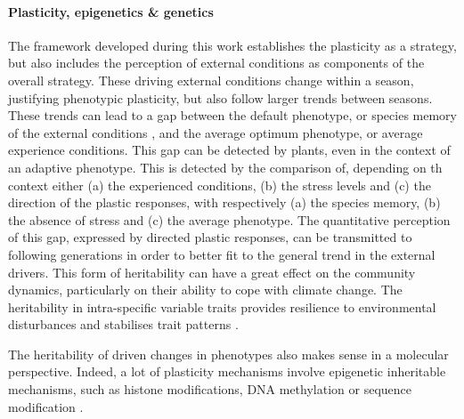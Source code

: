 

\paragraph{Plasticity, epigenetics \& genetics}

The framework developed during this work establishes the plasticity as a strategy, but also includes the perception of external conditions as components of the overall strategy. These driving external conditions change within a season, justifying phenotypic plasticity, but also follow larger trends between seasons. These trends can lead to a gap between the default phenotype, or species memory of the external conditions , and the average optimum phenotype, or average experience conditions. This gap can be detected by plants, even in the context of an adaptive phenotype. This is detected by the comparison of, depending on th context either (a) the experienced conditions, (b) the stress levels and (c) the direction of the plastic responses, with respectively (a) the species memory, (b) the absence of stress and (c) the average phenotype. The quantitative perception of this gap, expressed by directed plastic responses, can be transmitted to following generations in order to better fit to the general trend in the external drivers. This form of heritability can have a great effect on the community dynamics, particularly on their ability to cope with climate change. The heritability in intra-specific variable traits provides resilience to environmental disturbances and stabilises trait patterns \parencite{barabas_effect_2016}.

The heritability of driven changes in phenotypes also makes sense in a molecular perspective. Indeed, a lot of plasticity mechanisms involve epigenetic inheritable mechanisms, such as histone modifications, DNA methylation or sequence modification \parencite{nicotra_plant_2010}.

